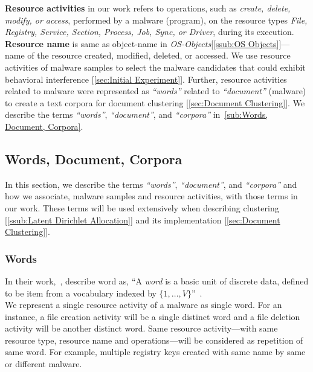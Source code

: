 \textbf{Resource activities} in our work refers to operations, such as \emph{create, delete, modify, or access}, performed by a malware (program), on the resource types \emph{File, Registry, Service, Section, Process, Job, Sync, or Driver}, during its execution.
\textbf{Resource name} is same as object-name in \emph{OS-Objects}[\autoref{ssub:OS Objects}]---name of the resource created, modified, deleted, or accessed.
We use resource activities of malware samples to select the malware candidates that could exhibit behavioral interference [\autoref{sec:Initial Experiment}].
Further, resource activities related to malware were represented as \emph{``words''} related to \emph{``document''} (malware) to create a text corpora for document clustering [\autoref{sec:Document Clustering}].
We describe the terms \emph{``words''}, \emph{``document''}, and \emph{``corpora''} in~\autoref{sub:Words, Document, Corpora}.
\subsection{Words, Document, Corpora}
\label{sub:Words, Document, Corpora}
In this section, we describe the terms \emph{``words''}, \emph{``document''}, and \emph{``corpora''} and how we associate, malware samples and resource activities, with those terms in our work.
These terms will be used extensively when describing clustering [\autoref{ssub:Latent Dirichlet Allocation}] and its implementation [\autoref{sec:Document Clustering}].
\subsubsection{Words}
\label{ssub:Words}
In their work,~\citeauthor{Blei}, describe word as, ``A \emph{word} is a basic unit of discrete data, defined to be item from a vocabulary indexed by $\{1,\ldots,V\}$''~\cite[]{Blei}.\\
We represent a single resource activity of a malware as single word.
For an instance, a file creation activity will be a single distinct word and a file deletion activity will be another distinct word.
Same resource activity---with same resource type, resource name and operations---will be considered as repetition of same word.
For example, multiple registry keys created with same name by same or different malware.
